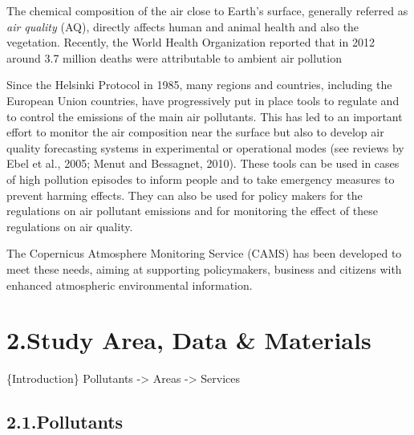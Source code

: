 \documentclass[9pt]{report}
\begin{document}
\noindent{}The chemical composition of the air close to Earth’s surface, generally referred as \emph{air quality} (AQ), directly affects human and animal health and also the vegetation. 
Recently, the World Health Organization reported that in 2012 around 3.7 million deaths were attributable to ambient air pollution %

Since the Helsinki Protocol in 1985, many regions and countries, including the European Union countries, have progressively put in place tools to regulate and to control the emissions of the main air pollutants. 
This has led to an important effort to monitor the air composition near the surface but also to develop air quality forecasting systems in experimental or operational modes (see reviews by Ebel et al., 2005; Menut and Bessagnet, 2010).
These tools can be used in cases of high pollution episodes to inform people and to take emergency measures to prevent harming effects. 
They can also be used for policy makers for the regulations on air pollutant emissions and for monitoring the effect of these regulations on air quality.%

The Copernicus Atmosphere Monitoring Service (CAMS) 
has been developed to meet these needs, aiming at supporting policymakers, 
business and citizens with enhanced atmospheric environmental information.%

\section{2.\hspace*{0.5em}Study Area, Data \& Materials}\label{sec-study-area-data-materials}%

\noindent{}\{Introduction\}
Pollutants -\textgreater{} Areas -\textgreater{} Services%

\subsection{2.1.\hspace*{0.5em}Pollutants}\label{sec-pollutants}%
\end{document}
